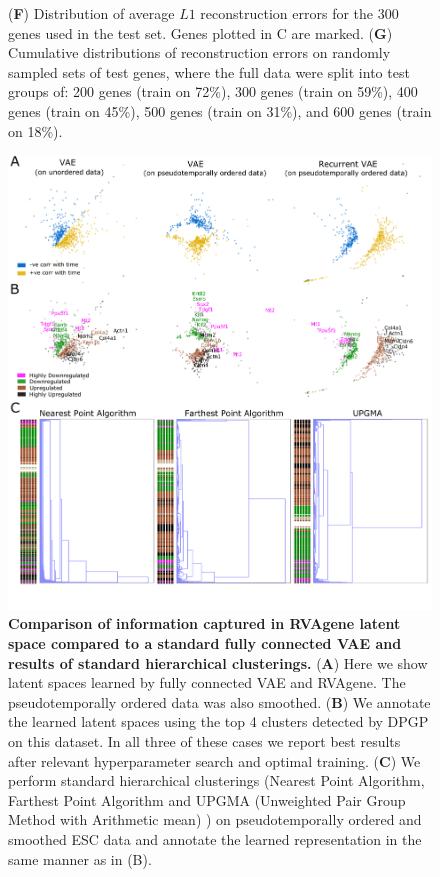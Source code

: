 {\begin{figure}
{    ({\bf F}) Distribution of average $L1$ reconstruction errors for the 300 genes used in the test set. Genes plotted in C are marked.
    ({\bf G}) Cumulative distributions of reconstruction errors on randomly sampled sets of test genes, where the full data were split into test groups of: 200 genes (train on 72\%), 300 genes (train on 59\%), 400 genes (train on 45\%), 500 genes (train on 31\%), and 600 genes (train on 18\%).}
    \label{fig:fig3}
\end{figure}
}

{\centering
\begin{figure}
  \includegraphics[width=\linewidth]{figures/vae_comp.png}
    \caption[Comparison of information captured in RVAgene latent space compared to a standard fully connected VAE and results of standard hierarchical clusterings.]{\textbf{Comparison of information captured in RVAgene latent space compared to a standard fully connected VAE and results of standard hierarchical clusterings.}
    ({\bf A}) Here we show latent spaces learned by fully connected VAE and RVAgene. The pseudotemporally ordered data was also smoothed. ({\bf B}) We annotate the learned latent spaces using the top 4 clusters detected by DPGP on this dataset. In all three of these cases we report best results after relevant hyperparameter search and optimal training. ({\bf C}) We perform standard hierarchical clusterings (Nearest Point Algorithm, Farthest Point Algorithm and UPGMA (Unweighted Pair Group Method with Arithmetic mean) ) on pseudotemporally ordered and smoothed ESC data and annotate the learned representation in the same manner as in (B).} 
  \label{fig:fig4}
\end{figure}}

